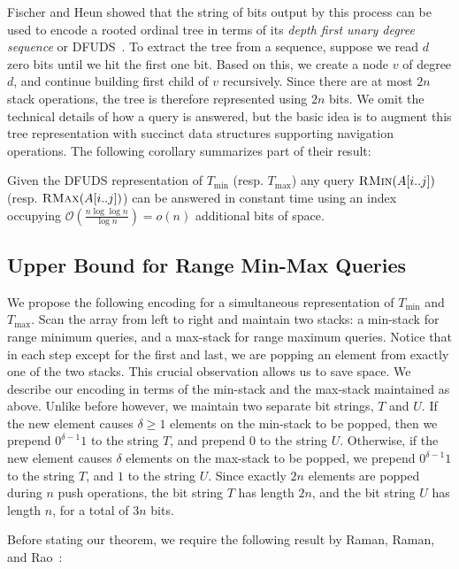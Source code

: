 \documentclass[runningheads]{llncs}
\newcommand{\rmin}{\textsc{RMin}}
\newcommand{\rmax}{\textsc{RMax}}
\newcommand{\Oh}{\mathcal{O}}
\begin{document}
Fischer and Heun showed that the string of bits output by this process
can be used to encode a rooted ordinal tree in terms of its
\emph{depth first unary degree sequence} or DFUDS~\cite{FH11}.  To
extract the tree from a sequence, suppose we read $d$ zero bits until
we hit the first one bit.  Based on this, we create a node $v$ of
degree $d$, and continue building first child of $v$ recursively.
Since there are at most $2n$ stack operations, the tree is therefore
represented using $2n$ bits.  We omit the technical details of how a
query is answered, but the basic idea is to augment this tree
representation with succinct data structures supporting navigation
operations.  The following corollary summarizes part of their result:

\begin{lemma}\label{lem:aux-index}
Given the DFUDS representation of $T_{\min}$ (resp. $T_{\max}$) any
query $\rmin(A[i..j])$ (resp. $\rmax(A[i..j])$) can be
answered in constant time using an index occupying $\Oh(\frac{n \log
  \log n}{ \log n}) = o(n)$ additional bits of space.
\end{lemma}

\subsection{Upper Bound for Range Min-Max Queries}

We propose the following encoding for a simultaneous representation of
$T_{\min}$ and $T_{\max}$.  Scan the array from left to right and
maintain two stacks: a min-stack for range minimum queries, and a
max-stack for range maximum queries.  Notice that in each step except
for the first and last, we are popping an element from exactly one of
the two stacks.  This crucial observation allows us to save space.  We
describe our encoding in terms of the min-stack and the max-stack
maintained as above.  Unlike before however, we maintain two separate
bit strings, $T$ and $U$. If the new element causes $\delta \ge 1$
elements on the min-stack to be popped, then we prepend
$0^{\delta-1}1$ to the string $T$, and prepend $0$ to the string $U$.
Otherwise, if the new element causes $\delta$ elements on the
max-stack to be popped, we prepend $0^{\delta-1}1$ to the string $T$,
and $1$ to the string $U$.  Since exactly $2n$ elements are popped
during $n$ push operations, the bit string $T$ has length $2n$, and
the bit string $U$ has length $n$, for a total of $3n$ bits.

Before stating our theorem, we require the following result by Raman,
Raman, and Rao~\cite{RRR07}:
\end{document}
